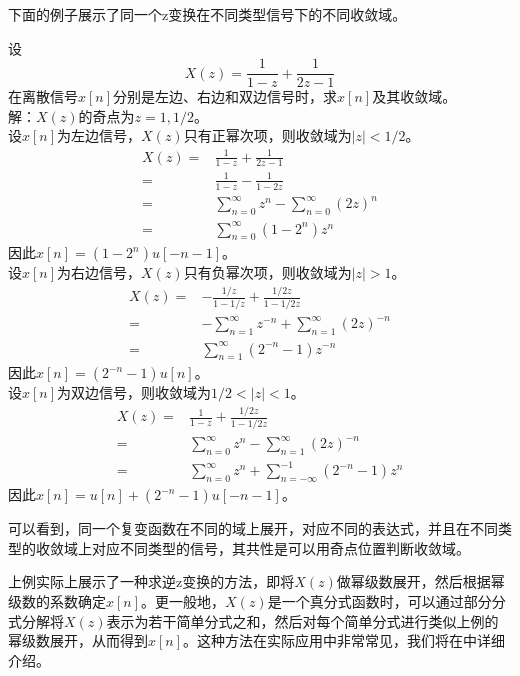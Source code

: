 下面的例子展示了同一个z变换在不同类型信号下的不同收敛域。
\begin{example}[收敛域的确定]\label{exmp:ROC}
    设$$X(z)=\frac{1}{1-z}+\frac{1}{2z-1}$$
    在离散信号$x[n]$分别是左边、右边和双边信号时，求$x[n]$及其收敛域。\\
    解：$X(z)$的奇点为$z=1,1/2$。\\
    设$x[n]$为左边信号，$X(z)$只有正幂次项，则收敛域为$|z|<1/2$。
    \begin{align*}
        X(z)=&\frac{1}{1-z}+\frac{1}{2z-1}\\
        =&\frac{1}{1-z}-\frac{1}{1-2z}\\
        =&\sum_{n=0}^{\infty}z^{n}-\sum_{n=0}^{\infty}\left(2z\right)^{n}\\
        =&\sum_{n=0}^{\infty}\left(1-2^{n}\right)z^{n}
    \end{align*}
    因此$x[n]=(1-2^{n})u[-n-1]$。\\
    设$x[n]$为右边信号，$X(z)$只有负幂次项，则收敛域为$|z|>1$。
    \begin{align*}
        X(z)=&-\frac{1/z}{1-1/z}+\frac{1/2z}{1-1/2z}\\
        =&-\sum_{n=1}^{\infty}z^{-n}+\sum_{n=1}^{\infty}\left(2z\right)^{-n}\\
        =&\sum_{n=1}^{\infty}\left(2^{-n}-1\right)z^{-n}
    \end{align*}
    因此$x[n]=(2^{-n}-1)u[n]$。\\
    设$x[n]$为双边信号，则收敛域为$1/2<|z|<1$。 
    \begin{align*}
        X(z)=&\frac{1}{1-z}+\frac{1/2z}{1-1/2z}\\
        =&\sum_{n=0}^{\infty}z^{n}-\sum_{n=1}^{\infty}\left(2z\right)^{-n}\\
        =&\sum_{n=0}^{\infty}z^{n}+\sum_{n=-\infty}^{-1}\left(2^{-n}-1\right)z^{n}
    \end{align*}
    因此$x[n]=u[n]+(2^{-n}-1)u[-n-1]$。
\end{example}
可以看到，同一个复变函数在不同的域上展开，对应不同的表达式，并且在不同类型的收敛域上对应不同类型的信号，其共性是可以用奇点位置判断收敛域。

上例实际上展示了一种求逆z变换的方法，即将$X(z)$做幂级数展开，然后根据幂级数的系数确定$x[n]$。更一般地，$X(z)$是一个真分式函数时，可以通过部分分式分解将$X(z)$表示为若干简单分式之和，然后对每个简单分式进行类似上例的幂级数展开，从而得到$x[n]$。这种方法在实际应用中非常常见，我们将在中详细介绍。

